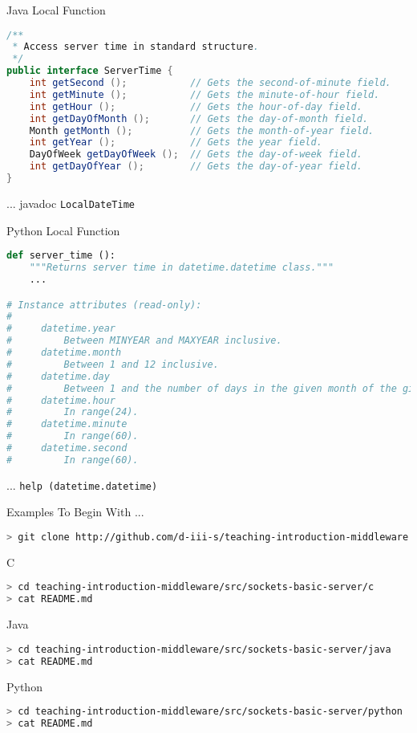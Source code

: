 \begin{frame}[fragile]{Java Local Function}
\begin{lstlisting}[language=java,style=mini]
/**
 * Access server time in standard structure.
 */
public interface ServerTime {
    int getSecond ();           // Gets the second-of-minute field.
    int getMinute ();           // Gets the minute-of-hour field.
    int getHour ();             // Gets the hour-of-day field.
    int getDayOfMonth ();       // Gets the day-of-month field.
    Month getMonth ();          // Gets the month-of-year field.
    int getYear ();             // Gets the year field.
    DayOfWeek getDayOfWeek ();  // Gets the day-of-week field.
    int getDayOfYear ();        // Gets the day-of-year field.
}
\end{lstlisting}
    \hfill ... javadoc \lstinline{LocalDateTime}
\end{frame}


\begin{frame}[fragile]{Python Local Function}
\begin{lstlisting}[language=python,style=mini]
def server_time ():
    """Returns server time in datetime.datetime class."""
    ...

# Instance attributes (read-only):
#
#     datetime.year
#         Between MINYEAR and MAXYEAR inclusive.
#     datetime.month
#         Between 1 and 12 inclusive.
#     datetime.day
#         Between 1 and the number of days in the given month of the given year.
#     datetime.hour
#         In range(24).
#     datetime.minute
#         In range(60).
#     datetime.second
#         In range(60).
\end{lstlisting}
    \hfill ... \lstinline{help (datetime.datetime)}
\end{frame}


\begin{frame}[fragile]{Examples To Begin With ...}
\begin{lstlisting}[language=bash,style=mini]
> git clone http://github.com/d-iii-s/teaching-introduction-middleware.git
\end{lstlisting}
    \begin{block}{C}
\begin{lstlisting}[language=bash,style=mini]
> cd teaching-introduction-middleware/src/sockets-basic-server/c
> cat README.md
\end{lstlisting}
    \end{block}
    \begin{block}{Java}
\begin{lstlisting}[language=bash,style=mini]
> cd teaching-introduction-middleware/src/sockets-basic-server/java
> cat README.md
\end{lstlisting}
    \end{block}
    \begin{block}{Python}
\begin{lstlisting}[language=bash,style=mini]
> cd teaching-introduction-middleware/src/sockets-basic-server/python
> cat README.md
\end{lstlisting}
    \end{block}
\end{frame}


